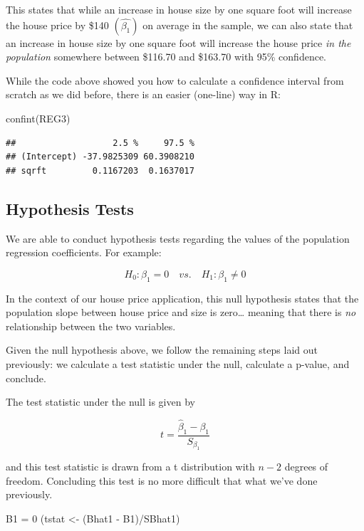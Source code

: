 \documentclass[
]{book}
\newenvironment{Shaded}{\begin{snugshade}}{\end{snugshade}}
\newcommand{\DecValTok}[1]{\textcolor[rgb]{0.00,0.00,0.81}{#1}}
\newcommand{\FunctionTok}[1]{\textcolor[rgb]{0.00,0.00,0.00}{#1}}
\newcommand{\NormalTok}[1]{#1}
\newcommand{\OtherTok}[1]{\textcolor[rgb]{0.56,0.35,0.01}{#1}}
\newcommand{\SpecialCharTok}[1]{\textcolor[rgb]{0.00,0.00,0.00}{#1}}
\begin{document}
This states that while an increase in house size by one square foot will increase the house price by \$140 \((\hat{\beta_1})\) on average in the sample, we can also state that an increase in house size by one square foot will increase the house price \emph{in the population} somewhere between \$116.70 and \$163.70 with 95\% confidence.

While the code above showed you how to calculate a confidence interval from scratch as we did before, there is an easier (one-line) way in R:

\begin{Shaded}
\begin{Highlighting}[]
\FunctionTok{confint}\NormalTok{(REG3)}
\end{Highlighting}
\end{Shaded}

\begin{verbatim}
##                   2.5 %     97.5 %
## (Intercept) -37.9825309 60.3908210
## sqrft         0.1167203  0.1637017
\end{verbatim}

\hypertarget{hypothesis-tests}{%
\subsection{Hypothesis Tests}\label{hypothesis-tests}}

We are able to conduct hypothesis tests regarding the values of the population regression coefficients. For example:

\[H_0:\beta_1 = 0 \quad vs. \quad H_1:\beta_1 \neq 0\]

In the context of our house price application, this null hypothesis states that the population slope between house price and size is zero\ldots{} meaning that there is \emph{no} relationship between the two variables.

Given the null hypothesis above, we follow the remaining steps laid out previously: we calculate a test statistic under the null, calculate a p-value, and conclude.

The test statistic under the null is given by

\[t=\frac{\hat{\beta}_1 - \beta_1}{S_{\beta_1}}\]

and this test statistic is drawn from a t distribution with \(n-2\) degrees of freedom. Concluding this test is no more difficult that what we've done previously.

\begin{Shaded}
\begin{Highlighting}[]
\NormalTok{B1 }\OtherTok{=} \DecValTok{0}
\NormalTok{(tstat }\OtherTok{\textless{}{-}}\NormalTok{ (Bhat1 }\SpecialCharTok{{-}}\NormalTok{ B1)}\SpecialCharTok{/}\NormalTok{SBhat1)}
\end{Highlighting}
\end{Shaded}
\end{document}
